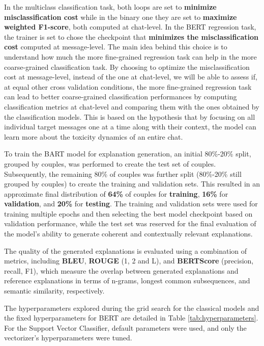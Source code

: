 \documentclass[twocolumn]{ceurart}
\begin{document}
In the multiclass classification task, both loops are set to \textbf{minimize misclassification cost} while in the binary one they are set to \textbf{maximize weighted F1-score}, both computed at chat-level. In the BERT regression task, the trainer is set to chose the checkpoint that \textbf{minimizes the misclassification cost} computed at message-level. The main idea behind this choice is to understand how much the more fine-grained regression task can help in the more coarse-grained classification task. By choosing to optimize the misclassification cost at message-level, instead of the one at chat-level, we will be able to assess if, at equal other cross validation conditions, the more fine-grained regression task can lead to better coarse-grained classification performances by computing classification metrics at chat-level and comparing them with the ones obtained by the classification models. This is based on the hypothesis that by focusing on all individual target messages one at a time along with their context, the model can learn more about the toxicity dynamics of an entire chat.

To train the BART model for explanation generation, an initial 80\%-20\% split, grouped by couples, was performed to create the test set of couples. Subsequently, the remaining 80\% of couples was further split (80\%-20\% still grouped by couples) to create the training and validation sets. This resulted in an approximate final distribution of \textbf{64\%} of couples for \textbf{training}, \textbf{16\%} for \textbf{validation}, and \textbf{20\%} for \textbf{testing}. The training and validation sets were used for training multiple epochs and then selecting the best model checkpoint based on validation performance, while the test set was reserved for the final evaluation of the model's ability to generate coherent and contextually relevant explanations.

The quality of the generated explanations is evaluated using a combination of metrics, including \textbf{BLEU}, \textbf{ROUGE} (1, 2 and L), and \textbf{BERTScore} (precision, recall, F1), which measure the overlap between generated explanations and reference explanations in terms of n-grams, longest common subsequences, and semantic similarity, respectively.

The hyperparameters explored during the grid search for the classical models and the fixed hyperparameters for BERT are detailed in Table \ref{tab:hyperparameters}. For the Support Vector Classifier, default parameters were used, and only the vectorizer's hyperparameters were tuned.
\end{document}
